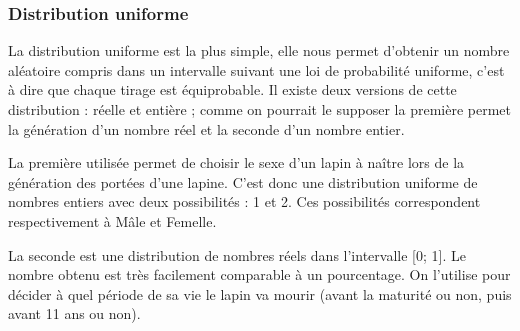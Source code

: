 \documentclass[11)pt,a4paper]{article}
\begin{document}
        \subsubsection{Distribution uniforme}
            La distribution uniforme est la plus simple, elle nous permet d'obtenir un nombre aléatoire
            compris dans un intervalle suivant une loi de probabilité uniforme, c'est à dire que chaque tirage est équiprobable.
            Il existe deux versions de cette distribution : réelle et entière ; comme on pourrait le supposer la première permet la génération d'un nombre réel et la seconde d'un nombre entier.
            \par
            La première utilisée permet de choisir le sexe d'un lapin à naître lors de la génération des portées d'une lapine.
            C'est donc une distribution uniforme de nombres entiers avec deux possibilités : 1 et 2.
            Ces possibilités correspondent respectivement à Mâle et Femelle.
            \begin{mdframed}[backgroundcolor=light-gray, roundcorner=20pt, innerleftmargin=20, innertopmargin=1, innerbottommargin=1, outerlinewidth=1, linecolor=darkgray]
                
            \end{mdframed}
            \begin{mdframed}[backgroundcolor=light-gray, roundcorner=20pt, innerleftmargin=20, innertopmargin=1, innerbottommargin=1, outerlinewidth=1, linecolor=darkgray]
                
            \end{mdframed}
            \par
            La seconde est une distribution de nombres réels dans l'intervalle [0; 1]. Le nombre obtenu est très facilement comparable à un pourcentage.
            On l'utilise pour décider à quel période de sa vie le lapin va mourir (avant la maturité ou non, puis avant 11 ans ou non).
            \begin{mdframed}[backgroundcolor=light-gray, roundcorner=20pt, innerleftmargin=20, innertopmargin=1, innerbottommargin=1, outerlinewidth=1, linecolor=darkgray]
                
            \end{mdframed}
\end{document}
